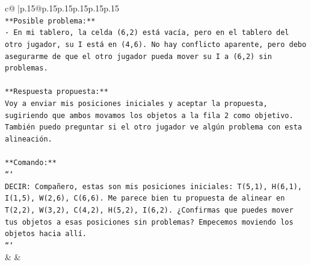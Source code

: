 \documentclass{article}
\begin{document}
{\begin{supertabular}{c@{$\;$}|p{.15\linewidth}@{}p{.15\linewidth}p{.15\linewidth}p{.15\linewidth}p{.15\linewidth}p{.15\linewidth}}
{{{\\ 
\texttt{**Posible problema:**} \\
\texttt{{-} En mi tablero, la celda (6,2) está vacía, pero en el tablero del otro jugador, su I está en (4,6). No hay conflicto aparente, pero debo asegurarme de que el otro jugador pueda mover su I a (6,2) sin problemas.} \\
\\ 
\texttt{**Respuesta propuesta:**} \\
\texttt{Voy a enviar mis posiciones iniciales y aceptar la propuesta, sugiriendo que ambos movamos los objetos a la fila 2 como objetivo. También puedo preguntar si el otro jugador ve algún problema con esta alineación.} \\
\\ 
\texttt{**Comando:**} \\
\texttt{```} \\
\texttt{DECIR: Compañero, estas son mis posiciones iniciales: T(5,1), H(6,1), I(1,5), W(2,6), C(6,6). Me parece bien tu propuesta de alinear en T(2,2), W(3,2), C(4,2), H(5,2), I(6,2). ¿Confirmas que puedes mover tus objetos a esas posiciones sin problemas? Empecemos moviendo los objetos hacia allí.} \\
\texttt{```} \\
            }
        }
    }
    & & \\ \\


\end{supertabular}}
\end{document}
